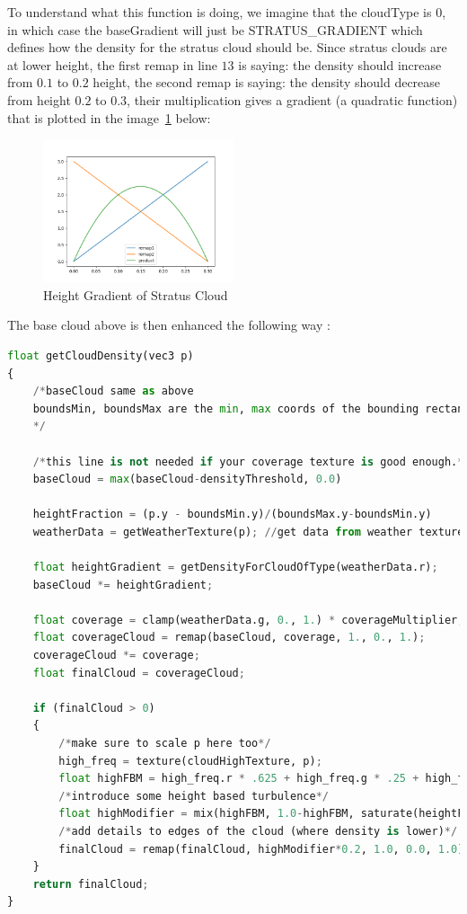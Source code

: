 To understand what this function is doing, we imagine that the cloudType is $0$, in which case the baseGradient will just be STRATUS\_GRADIENT which defines how the density for the stratus cloud should be. Since stratus clouds are at lower height, the first remap in line $13$ is saying: the density should increase from $0.1$ to $0.2$ height, the second remap is saying: the density should decrease from height $0.2$ to $0.3$, their multiplication gives a gradient (a quadratic function) that is plotted in the image~\ref{fig:stratus_grad} below:
\begin{figure}[H]
    \centering
    \includegraphics[width=0.5\textwidth]{images/stratus_grad.png}
    \caption{Height Gradient of Stratus Cloud}
    \label{fig:stratus_grad}
\end{figure}

The base cloud above is then enhanced the following way \cite{engel2016gpupro7} \cite{gamedevnet2015horizonzerodawn}:
\begin{lstlisting}[language=Python]
float getCloudDensity(vec3 p)
{
    /*baseCloud same as above
    boundsMin, boundsMax are the min, max coords of the bounding rectangle (AABB)
    */

    /*this line is not needed if your coverage texture is good enough.*/
    baseCloud = max(baseCloud-densityThreshold, 0.0)

    heightFraction = (p.y - boundsMin.y)/(boundsMax.y-boundsMin.y)
    weatherData = getWeatherTexture(p); //get data from weather texture

    float heightGradient = getDensityForCloudOfType(weatherData.r);
    baseCloud *= heightGradient;

    float coverage = clamp(weatherData.g, 0., 1.) * coverageMultiplier;
    float coverageCloud = remap(baseCloud, coverage, 1., 0., 1.);
    coverageCloud *= coverage;
    float finalCloud = coverageCloud;

    if (finalCloud > 0)
    {
        /*make sure to scale p here too*/
        high_freq = texture(cloudHighTexture, p);
        float highFBM = high_freq.r * .625 + high_freq.g * .25 + high_freq.b * .125;
        /*introduce some height based turbulence*/
        float highModifier = mix(highFBM, 1.0-highFBM, saturate(heightFraction * 10.0));
        /*add details to edges of the cloud (where density is lower)*/
        finalCloud = remap(finalCloud, highModifier*0.2, 1.0, 0.0, 1.0);
    }
    return finalCloud;
}
\end{lstlisting}
